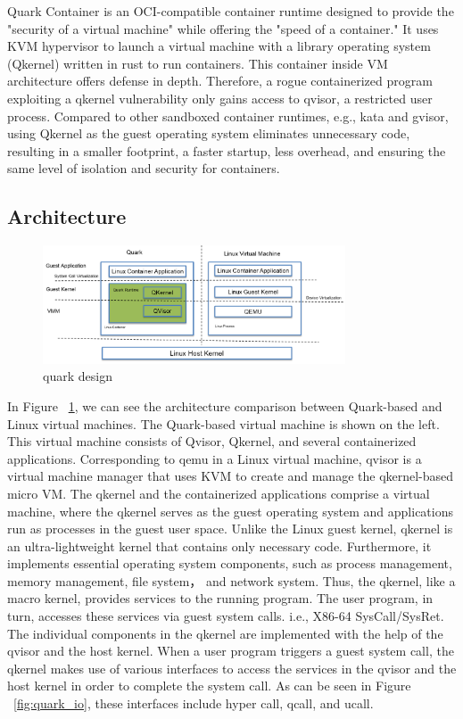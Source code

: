 Quark Container is an OCI-compatible container runtime\cite*{oci-runtime-spec}  designed to provide the "security of a virtual machine" while offering the "speed of a 
container\cite*{speed_secure_container_slogen}." It uses KVM hypervisor to launch a virtual machine with a library operating system (Qkernel) written in rust to run containers. 
This container inside VM architecture offers defense in depth. Therefore, a rogue containerized program exploiting a qkernel vulnerability only gains access to qvisor, 
a restricted user process.
Compared to other sandboxed container runtimes, e.g., kata\cite*{Kata-Containers} and gvisor\cite*{gvisor}, using Qkernel as the guest operating system eliminates unnecessary code, 
resulting in a smaller footprint, a faster startup, less overhead, and ensuring the same level of isolation and security for containers\cite*{quark_performance_report}.
\subsection{Architecture}
\begin{figure}[H]
    \centering
    \includegraphics[width=0.8\textwidth]{images/quark_design.png}
    \caption[quark design]{quark design}
    \label{fig:quark_design}
\end{figure}

In Figure ~\ref{fig:quark_design}, we can see the architecture comparison between Quark-based and Linux virtual machines. The Quark-based virtual machine is shown on the left. This virtual machine consists of Qvisor, 
Qkernel, and several containerized applications. Corresponding to qemu in a Linux virtual machine, qvisor is a virtual machine manager that uses KVM to create and manage the qkernel-based micro VM. 
The qkernel and the containerized applications comprise a virtual machine, where the qkernel serves as the guest operating system and applications run as processes in the guest user space. Unlike 
the Linux guest kernel, qkernel is an ultra-lightweight kernel that contains only necessary code. Furthermore, it implements essential operating system components, such as process management, 
memory management, file system， and network system. Thus, the qkernel, like a macro kernel, provides services to the running program. The user program, in turn, accesses these services via guest 
system calls. i.e., X86-64 SysCall/SysRet. The individual components in the qkernel are implemented with the help of the qvisor and the host kernel. When a user program triggers a guest system call, the qkernel makes use of 
various interfaces to access the services in the qvisor and the host kernel in order to complete the system call. As can be seen in Figure ~\ref{fig:quark_io}, these interfaces include hyper call, qcall, and ucall.

